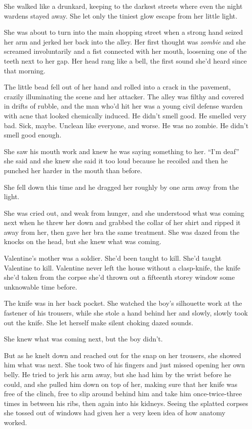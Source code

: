 She walked like a drunkard, keeping to the darkest streets where
even the night wardens stayed away. She let only the tiniest glow
escape from her little light.

She was about to turn into the main shopping street when a strong
hand seized her arm and jerked her back into the alley. Her first
thought was \emph{zombie} and she screamed involuntarily and a fist
connected with her mouth, loosening one of the teeth next to her
gap. Her head rang like a bell, the first sound she’d heard since
that morning.

The little bead fell out of her hand and rolled into a crack in the
pavement, crazily illuminating the scene and her attacker. The
alley was filthy and covered in drifts of rubble, and the man who’d
hit her was a young civil defense warden with acne that looked
chemically induced. He didn’t smell good. He smelled very bad.
Sick, maybe. Unclean like everyone, and worse. He was no zombie. He
didn’t smell good enough.

She saw his mouth work and knew he was saying something to her.
“I’m deaf” she said and she knew she said it too loud because he
recoiled and then he punched her harder in the mouth than before.

She fell down this time and he dragged her roughly by one arm away
from the light.

She was cried out, and weak from hunger, and she understood what
was coming next when he threw her down and grabbed the collar of
her shirt and ripped it away from her, then gave her bra the same
treatment. She was dazed from the knocks on the head, but she knew
what was coming.

Va\-len\-tine’s mother was a soldier. She’d been taught to kill. She’d
taught Valentine to kill. Valentine never left the house without a
clasp-knife, the knife she’d taken from the corpse she’d thrown out
a fifteenth storey window some unknowable time before.

The knife was in her back pocket. She watched the boy’s silhouette
work at the fastener of his trousers, while she stole a hand behind
her and slowly, slowly took out the knife. She let herself make
silent choking dazed sounds.

She knew what was coming next, but the boy didn’t.

But as he knelt down and reached out for the snap on her trousers,
she showed him what was next. She took two of his fingers and just
missed opening her own belly. He tried to jerk his arm away, but
she had him by the wrist before he could, and she pulled him down
on top of her, making sure that her knife was free of the clinch,
free to slip around behind him and take him once-twice-three times
in between his ribs, then again into his kidneys. Seeing the
splatted corpses she tossed out of windows had given her a very
keen idea of how anatomy worked.

